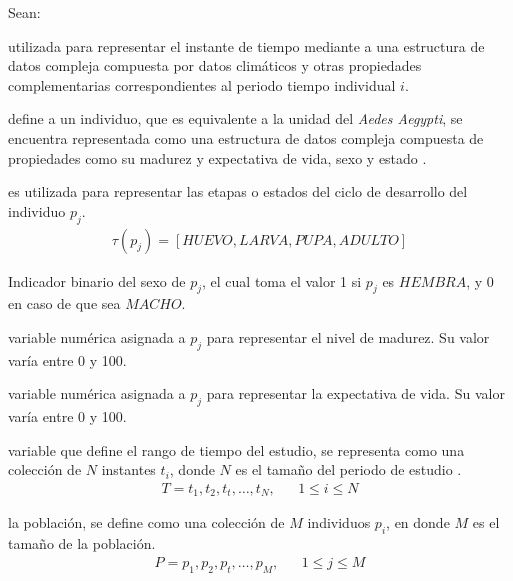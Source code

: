 Sean:
\begin{description}[style=multiline,leftmargin=1.5cm]
    \item[$t_{i}$] utilizada para representar el instante de tiempo mediante a una estructura de datos compleja
    compuesta por datos climáticos y otras propiedades complementarias correspondientes al periodo tiempo
    individual $i$.
    
    \item[$p_{i}$] define a un individuo, que es equivalente a la unidad del \textit{Aedes Aegypti}, se encuentra
    representada como una estructura de datos compleja compuesta de propiedades como su  madurez y expectativa de
    vida, sexo y estado .

    \item[$\tau(p_{j})$]  es utilizada para representar las etapas o estados del ciclo
    de desarrollo del individuo $p_{j}$.
    \begin{align*}
        \tau (p_{j}) = [HUEVO, LARVA, PUPA, ADULTO]
    \end{align*}

    \item[$S(p_{j})$]  Indicador binario del sexo de $p_{j}$, el cual toma el valor 1
    si $p_{j}$ es $HEMBRA$, y 0 en caso de que sea $MACHO$.

    \item[$\eta (p_{j})$]  variable numérica asignada a $p_{j}$ para representar el nivel
    de madurez. Su valor varía entre 0 y 100.
    
    \item[$\xi (p_{j})$]  variable numérica asignada a $p_{j}$ para representar la
    expectativa de vida. Su valor varía entre 0 y 100.
    
    \item[$T$] variable que define el rango de tiempo del estudio, se representa como una colección de $N$
    instantes $t_{i}$, donde $N$ es el tamaño del periodo de estudio .
        \begin{align*}
            T = t_1,t_2,t_t,\ldots,t_N , & & 1 \leq i \leq N
        \end{align*}

    \item[$P$] la población, se define como una colección de $M$ individuos $p_{i}$, en donde $M$ es el tamaño de
    la población.
    \begin{align*}
        P = p_1,p_2,p_t,\ldots,p_M,  & & 1 \leq j \leq M
    \end{align*}
    
\end{description}

